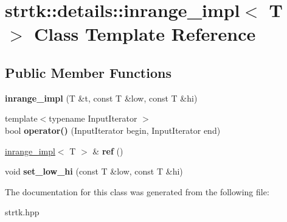 \hypertarget{classstrtk_1_1details_1_1inrange__impl}{\section{strtk\-:\-:details\-:\-:inrange\-\_\-impl$<$ T $>$ Class Template Reference}
\label{classstrtk_1_1details_1_1inrange__impl}
}
\subsection*{Public Member Functions}
\begin{DoxyCompactItemize}
\item 
\hypertarget{classstrtk_1_1details_1_1inrange__impl_a8fe6d156bcdb972f4c797c8128ee990c}{{\bfseries inrange\-\_\-impl} (T \&t, const T \&low, const T \&hi)}\label{classstrtk_1_1details_1_1inrange__impl_a8fe6d156bcdb972f4c797c8128ee990c}

\item 
\hypertarget{classstrtk_1_1details_1_1inrange__impl_a8babe6b3489c12e8d665cde5aa781e87}{{\footnotesize template$<$typename Input\-Iterator $>$ }\\bool {\bfseries operator()} (Input\-Iterator begin, Input\-Iterator end)}\label{classstrtk_1_1details_1_1inrange__impl_a8babe6b3489c12e8d665cde5aa781e87}

\item 
\hypertarget{classstrtk_1_1details_1_1inrange__impl_a2a9f26c304a5b1f5547b70270cf350c1}{\hyperlink{classstrtk_1_1details_1_1inrange__impl}{inrange\-\_\-impl}$<$ T $>$ \& {\bfseries ref} ()}\label{classstrtk_1_1details_1_1inrange__impl_a2a9f26c304a5b1f5547b70270cf350c1}

\item 
\hypertarget{classstrtk_1_1details_1_1inrange__impl_a3bff748a298b38ad9dd4cd00de6e9149}{void {\bfseries set\-\_\-low\-\_\-hi} (const T \&low, const T \&hi)}\label{classstrtk_1_1details_1_1inrange__impl_a3bff748a298b38ad9dd4cd00de6e9149}

\end{DoxyCompactItemize}


The documentation for this class was generated from the following file\-:\begin{DoxyCompactItemize}
\item 
strtk.\-hpp\end{DoxyCompactItemize}

